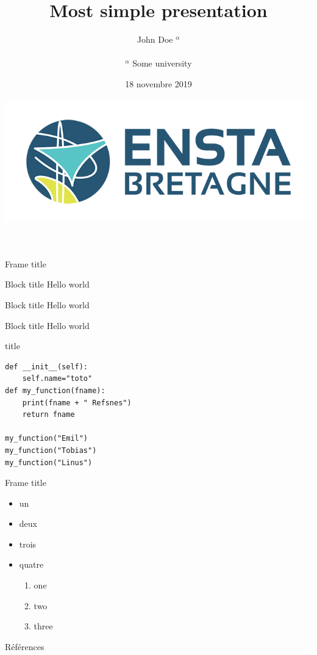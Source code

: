 \documentclass[aspectratio=169]{beamer}
\begin{document}
	\title{Most simple presentation}
	\author{John Doe $^{\alpha}$\\~\\
		\small{$^{\alpha}$ Some university}} 
	\date{18 novembre 2019\\~\\\includegraphics[width=.5\textwidth]{images/ensta-couleur}} 
	\frame[plain]{\titlepage} 
	
	\begin{frame}{Frame title}
		\begin{exampleblock}{Block title}
			Hello world
		\end{exampleblock}
		\begin{block}{Block title}
			Hello world 
		\end{block}
		\begin{alertblock}{Block title}
			Hello world \cite{Feynman1941}
		\end{alertblock}
	\end{frame}
	\begin{frame}[fragile]{title}
		\begin{lstlisting}[style=customc]
def __init__(self):
	self.name="toto"
def my_function(fname):
	print(fname + " Refsnes")
	return fname
		
my_function("Emil")
my_function("Tobias")
my_function("Linus") 
		\end{lstlisting}
	\end{frame}
	\begin{frame}{Frame title}
		\begin{itemize}
			\item un
			\item deux
			\item trois
			\item quatre
			\begin{enumerate}
				\item one
				\item two
				\item three
			\end{enumerate}
		\end{itemize}
	\end{frame}
	\begin{frame}{Références}
		\printbibliography
	\end{frame}
\end{document}
